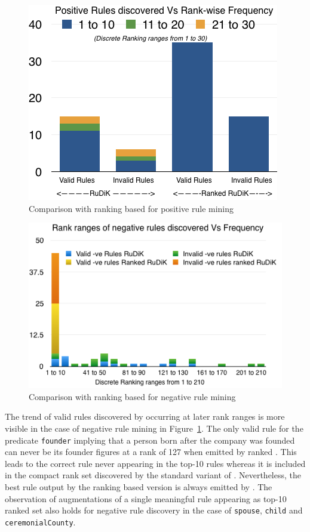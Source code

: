 \begin{figure}[htb]
	\centering
	\includegraphics[width=\columnwidth]{include/figure/posRulesRanked.png}
	\caption{Comparison with ranking based \krd for positive rule mining}
	\label{fig:posRulesRanked}
\end{figure}

\begin{figure}[htb]
	\centering
	\includegraphics[width=\columnwidth]{include/figure/negRulesRanked.png}
	\caption{Comparison with ranking based \krd for negative rule mining}
	\label{fig:negRulesRanked}
\end{figure}

The trend of valid rules discovered by \krd occurring at later rank ranges is more visible in the case of negative rule mining in Figure~\ref{fig:posRulesRanked}. The only valid rule for the predicate \texttt{founder} implying that a person born after the company was founded can never be its founder figures at a rank of 127 when emitted by ranked \krd. This leads to the correct rule never appearing in the top-10 rules whereas it is included in the compact rank set discovered by the standard variant of \krd. Nevertheless, the best rule output by the ranking based version is always emitted by \krd. The observation of augmentations of a single meaningful rule appearing as top-10 ranked set also holds for negative rule discovery in the case of \texttt{spouse}, \texttt{child} and \texttt{ceremonialCounty}.